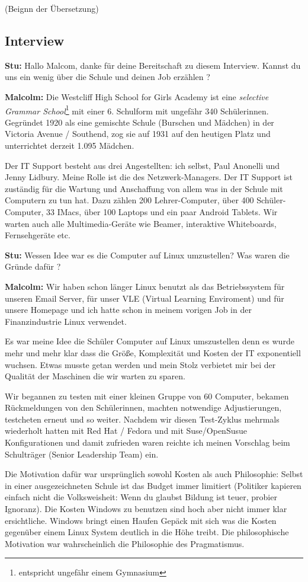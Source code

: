 \documentclass[10pt,a4paper,ngerman,twoside]{article} %
\begin{document}
\begin{multicols}{3}
(Beignn der Übersetzung)

\subsection*{Interview}
\textbf{Stu:} Hallo Malcom, danke für deine Bereitschaft zu diesem Interview. Kannst du uns ein wenig über die Schule und deinen Job erzählen ?

\textbf{Malcolm:} Die Westcliff High School for Girls Academy ist  eine \textit{selective Grammar School}\footnote{entspricht ungefähr einem Gymnasium} mit einer 6. Schulform mit ungefähr 340 Schülerinnen. Gegründet 1920 als eine gemischte Schule (Burschen und Mädchen) in der Victoria Avenue / Southend, zog sie auf 1931 auf den heutigen Platz und unterrichtet derzeit 1.095 Mädchen.

Der IT Support besteht aus drei Angestellten: ich selbst, Paul Anonelli und Jenny Lidbury. Meine Rolle ist die des Netzwerk-Managers. Der IT Support ist zuständig für die Wartung und Anschaffung von allem was in der Schule mit Computern zu tun hat. Dazu zählen 200 Lehrer-Computer, über 400 Schüler-Computer, 33 IMacs, über 100 Laptops und ein paar Android Tablets. Wir warten auch alle Multimedia-Geräte wie Beamer, interaktive Whiteboards, Fernsehgeräte etc.

\textbf{Stu:} Wessen Idee war es die Computer auf Linux umzustellen? Was waren die Gründe dafür ?

\textbf{Malcolm:} Wir haben schon länger Linux benutzt als das Betriebssystem für unseren Email Server, für unser VLE (Virtual Learning Enviroment) und für unsere Homepage und ich hatte schon in meinem vorigen Job in der Finanzindustrie Linux verwendet. 

Es war meine Idee die Schüler Computer auf Linux umszustellen denn es wurde mehr und mehr klar dass die Größe, Komplexität und Kosten der IT exponentiell wuchsen. Etwas musste getan werden und mein Stolz verbietet mir bei der Qualität der Maschinen die wir warten zu sparen. 

Wir begannen zu testen mit einer kleinen Gruppe von 60 Computer, bekamen Rückmeldungen von den Schülerinnen, machten notwendige Adjustierungen, testcheten erneut und so weiter. Nachdem wir diesen Test-Zyklus mehrmals wiederholt hatten mit Red Hat / Fedora und mit Suse/OpenSusue Konfigurationen und damit zufrieden waren reichte ich meinen Vorschlag beim Schulträger (Senior Leadership Team) ein.

Die Motivation dafür war ursprünglich sowohl Kosten als auch Philosophie: Selbst in einer ausgezeichneten Schule ist das Budget immer limitiert (Politiker kapieren einfach nicht die Volksweisheit: Wenn du glaubst Bildung ist teuer, probier Ignoranz). Die Kosten Windows zu benutzen sind hoch aber nicht immer klar ersichtliche. Windows bringt einen Haufen Gepäck mit sich was die Kosten gegenüber einem Linux System deutlich in die Höhe treibt. Die philosophische Motivation war wahrscheinlich die Philosophie des Pragmatismus.


\end{multicols}
\end{document}
